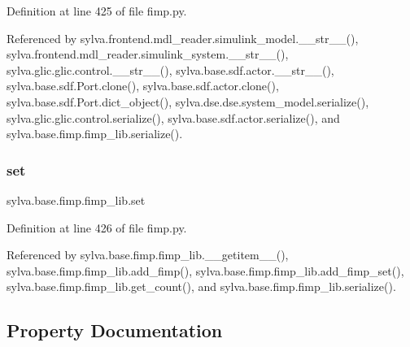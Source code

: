Definition at line 425 of file fimp.\+py.



Referenced by sylva.\+frontend.\+mdl\+\_\+reader.\+simulink\+\_\+model.\+\_\+\+\_\+str\+\_\+\+\_\+(), sylva.\+frontend.\+mdl\+\_\+reader.\+simulink\+\_\+system.\+\_\+\+\_\+str\+\_\+\+\_\+(), sylva.\+glic.\+glic.\+control.\+\_\+\+\_\+str\+\_\+\+\_\+(), sylva.\+base.\+sdf.\+actor.\+\_\+\+\_\+str\+\_\+\+\_\+(), sylva.\+base.\+sdf.\+Port.\+clone(), sylva.\+base.\+sdf.\+actor.\+clone(), sylva.\+base.\+sdf.\+Port.\+dict\+\_\+object(), sylva.\+dse.\+dse.\+system\+\_\+model.\+serialize(), sylva.\+glic.\+glic.\+control.\+serialize(), sylva.\+base.\+sdf.\+actor.\+serialize(), and sylva.\+base.\+fimp.\+fimp\+\_\+lib.\+serialize().

\mbox{\label{classsylva_1_1base_1_1fimp_1_1fimp__lib_a6d2f4a5c592b6fc32418dc27129326ac}} 
\subsubsection{\texorpdfstring{set}{set}}
{\footnotesize\ttfamily sylva.\+base.\+fimp.\+fimp\+\_\+lib.\+set}



Definition at line 426 of file fimp.\+py.



Referenced by sylva.\+base.\+fimp.\+fimp\+\_\+lib.\+\_\+\+\_\+getitem\+\_\+\+\_\+(), sylva.\+base.\+fimp.\+fimp\+\_\+lib.\+add\+\_\+fimp(), sylva.\+base.\+fimp.\+fimp\+\_\+lib.\+add\+\_\+fimp\+\_\+set(), sylva.\+base.\+fimp.\+fimp\+\_\+lib.\+get\+\_\+count(), and sylva.\+base.\+fimp.\+fimp\+\_\+lib.\+serialize().



\subsection{Property Documentation}
\mbox{\label{classsylva_1_1base_1_1fimp_1_1fimp__lib_a35e572d841ddc8a2f4ea44fdf823e92d}} 
